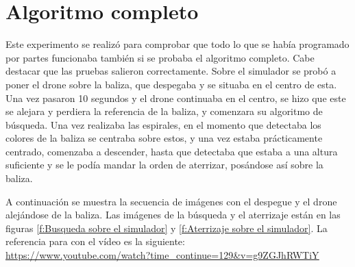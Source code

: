 \section{Algoritmo completo}
\hspace{1cm} Este experimento se realiz\'o para comprobar que todo lo que se hab\'ia programado por partes funcionaba tambi\'en si se probaba el algoritmo completo. Cabe destacar que las pruebas salieron correctamente. Sobre el simulador se prob\'o a poner el drone sobre la baliza, que despegaba y se situaba en el centro de esta. Una vez pasaron 10 segundos y el drone continuaba en el centro, se hizo que este se alejara y perdiera la referencia de la baliza, y comenzara su algoritmo de b\'usqueda. Una vez realizaba las espirales, en el momento que detectaba los colores de la baliza se centraba sobre estos, y una vez estaba pr\'acticamente centrado, comenzaba a descender, hasta que detectaba que estaba a una altura suficiente y se le pod\'ia mandar la orden de aterrizar, pos\'andose as\'i sobre la baliza. 

A continuaci\'on se muestra la secuencia de im\'agenes con el despegue y el drone alej\'andose de la baliza. Las im\'agenes de la b\'usqueda y el aterrizaje est\'an en las figuras \ref{f:Busqueda sobre el simulador} y \ref{f:Aterrizaje sobre el simulador}. La referencia para con el v\'ideo es la siguiente:\\
\underline{\url{https://www.youtube.com/watch?time_continue=129&v=g9ZGJhRWTiY}}

